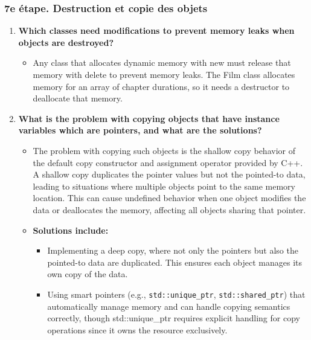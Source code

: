 \documentclass[
]{article}
\providecommand{\tightlist}{%
  \setlength{\itemsep}{0pt}\setlength{\parskip}{0pt}}
\begin{document}
\subsubsection{7e étape. Destruction et copie des
objets}\label{e-uxe9tape.-destruction-et-copie-des-objets}

\begin{enumerate}
\def\labelenumi{\arabic{enumi}.}
\item
  \textbf{Which classes need modifications to prevent memory leaks when
  objects are destroyed?}

  \begin{itemize}
  \tightlist
  \item
    Any class that allocates dynamic memory with new must release that
    memory with delete to prevent memory leaks. The Film class allocates
    memory for an array of chapter durations, so it needs a destructor
    to deallocate that memory.
  \end{itemize}
\item
  \textbf{What is the problem with copying objects that have instance
  variables which are pointers, and what are the solutions?}

  \begin{itemize}
  \item
    The problem with copying such objects is the shallow copy behavior
    of the default copy constructor and assignment operator provided by
    C++. A shallow copy duplicates the pointer values but not the
    pointed-to data, leading to situations where multiple objects point
    to the same memory location. This can cause undefined behavior when
    one object modifies the data or deallocates the memory, affecting
    all objects sharing that pointer.
  \item
    \textbf{Solutions include:}

    \begin{itemize}
    \tightlist
    \item
      Implementing a deep copy, where not only the pointers but also the
      pointed-to data are duplicated. This ensures each object manages
      its own copy of the data.
    \item
      Using smart pointers (e.g., \texttt{std::unique\_ptr},
      \texttt{std::shared\_ptr}) that automatically manage memory and
      can handle copying semantics correctly, though std::unique\_ptr
      requires explicit handling for copy operations since it owns the
      resource exclusively.
    \end{itemize}
  \end{itemize}
\end{enumerate}
\end{document}
